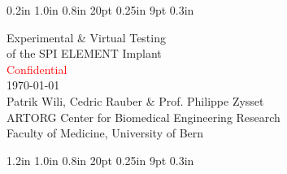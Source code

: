 \documentclass[12pt, a4paper, twoside]{report}
\begin{document}
\frontmatter
\setmarginsrb  {1.0in}  %
                        { 0.2in}  %
                        { 1.0in}  %
                        { 0.8in}  %
                        {  20pt}  %
                        {0.25in}  %
                        {   9pt}  %
                        { 0.3in}  %

\begin{titlepage}

  \hfill
{}

\begin{center}

\vspace*{3cm}
\vspace*{1cm}
{\LARGE {Experimental \& Virtual Testing \\ of the SPI ELEMENT Implant}} \\
\vspace*{1cm}
\large {\textcolor{red}{Confidential}} \\ 
\vspace*{4cm}
\today\\
\vspace*{1cm}
{Patrik Wili, Cedric Rauber \& Prof. Philippe Zysset}  \\
\vspace*{1.5cm}
\large{ARTORG Center for Biomedical Engineering Research}\\
\large {Faculty of Medicine, University of Bern} \\
\vspace*{0.8cm}

\end{center}
\end{titlepage}

\setmarginsrb  {1.0in}  %
                        { 1.2in}  %
                        { 1.0in}  %
                        { 0.8in}  %
                        {  20pt}  %
                        {0.25in}  %
                        {   9pt}  %
                        { 0.3in}  %
\end{document}
